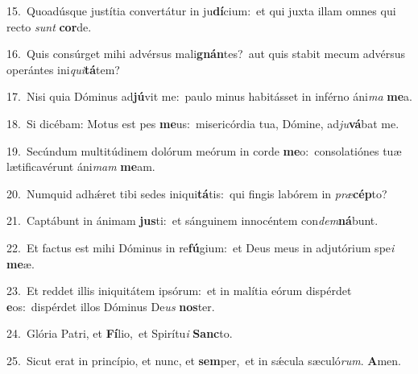 {\numbfont\textcolor{\numbcolor}{15.}}~Quoadúsque justítia convertátur in ju\-\textbf{dí}\-cium:~\star et qui juxta illam omnes qui recto \textit{sunt} \textbf{cor}\-de.\par
{\numbfont\textcolor{\numbcolor}{16.}}~Quis consúrget mihi advérsus mali\-\textbf{gnán}\-tes?~\star aut quis stabit mecum advérsus operántes ini\-\textit{qui}\-\textbf{tá}tem?\par
{\numbfont\textcolor{\numbcolor}{17.}}~Nisi quia Dóminus ad\-\textbf{jú}\-vit me:~\star paulo minus habitásset in inférno áni\textit{ma} \textbf{me}\-a.\par
{\numbfont\textcolor{\numbcolor}{18.}}~Si dicébam: Motus est pes \textbf{me}\-us:~\star misericórdia tua, Dómine, ad\-\textit{ju}\-\textbf{vá}bat me.\par
{\numbfont\textcolor{\numbcolor}{19.}}~Secúndum multitúdinem dolórum meórum in corde \textbf{me}\-o:~\star consolatiónes tuæ lætificavérunt áni\textit{mam} \textbf{me}\-am.\par
{\numbfont\textcolor{\numbcolor}{20.}}~Numquid adhǽret tibi sedes iniqui\-\textbf{tá}\-tis:~\star qui fingis labórem in \textit{præ}\-\textbf{cép}to?\par
{\numbfont\textcolor{\numbcolor}{21.}}~Captábunt in ánimam \textbf{jus}\-ti:~\star et sánguinem innocéntem con\-\textit{dem}\-\textbf{ná}bunt.\par
{\numbfont\textcolor{\numbcolor}{22.}}~Et factus est mihi Dóminus in re\-\textbf{fú}\-gium:~\star et Deus meus in adjutórium spe\textit{i} \textbf{me}\-æ.\par
{\numbfont\textcolor{\numbcolor}{23.}}~Et reddet illis iniquitátem ipsórum:~\dagger et in malítia eórum dispérdet \textbf{e}\-os:~\star dispérdet illos Dóminus De\textit{us} \textbf{nos}\-ter.\par
{\numbfont\textcolor{\numbcolor}{24.}}~Glória Patri, et \textbf{Fí}\-lio,~\star et Spirítu\textit{i} \textbf{Sanc}\-to.\par
{\numbfont\textcolor{\numbcolor}{25.}}~Sicut erat in princípio, et nunc, et \textbf{sem}\-per,~\star et in sǽcula sæculó\-\textit{rum}\-. \textbf{A}\-men.\par
